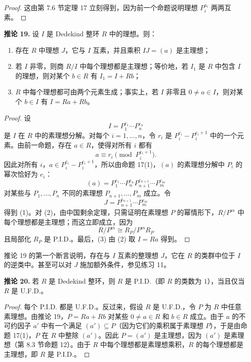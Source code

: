 \begin{proof}
这由第 7.6 节定理 17 立刻得到，因为前一个命题说明理想 $P_i^{a_i}$ 两两互素。
\end{proof}

\medskip
\noindent\textbf{推论 19.} 设 $I$ 是 Dedekind 整环 $R$ 中的理想。则：
\begin{enumerate}[label=(\arabic*)]
  \item 存在 $R$ 中理想 $J$，它与 $I$ 互素，并且乘积 $IJ=(a)$ 是主理想；
  \item 若 $I$ 非零，则商 $R/I$ 中每个理想都是主理想；等价地，若 $I_1$ 是 $R$ 中包含 $I$ 的理想，则对某个 $b\in R$ 有 $I_1=I+Rb$；
  \item $R$ 中每个理想都可由两个元素生成；事实上，若 $I$ 非零且 $0\neq a\in I$，则对某个 $b\in I$ 有 $I=Ra+Rb$。
\end{enumerate}

\begin{proof}
设
\[
  I=P_1^{e_1}\cdots P_n^{e_n}
\]
是 $I$ 在 $R$ 中的素理想分解。对每个 $i=1,
\ldots,n$，令 $r_i$ 是 $P_i^{e_i}-P_i^{e_i+1}$ 中的一个元素。由前一命题，存在 $a\in R$，使得对所有 $i$ 都有
\[
  a\equiv r_i\pmod{P_i^{e_i+1}}.
\]
因此对所有 $i$，$a\in P_i^{e_i}-P_i^{e_i+1}$，所以由命题 17(1)，$(a)$ 的素理想分解中 $P_i$ 的幂次恰好为 $e_i$：
\[
  (a)=P_1^{e_1}\cdots P_n^{e_n}P_{n+1}^{e_{n+1}}\cdots P_m^{e_m}
\]
对某些与 $P_1,
\ldots,P_n$ 不同的素理想 $P_{n+1},
\ldots,P_m$ 成立。令
\[
  J=P_{n+1}^{e_{n+1}}\cdots P_m^{e_m}
\]
得到 (1)。对 (2)，由中国剩余定理，只需证明在素理想 $P$ 的幂情形下，$R/P^m$ 中每个理想都是主理想；而这立即成立，因为
\[
  R/P^m\cong R_P/P^mR_P
\]
且局部化 $R_P$ 是 P.I.D.。最后，(3) 由 (2) 取 $I=Ra$ 得到。
\end{proof}

推论 19 的第一个断言说明，存在与 $I$ 互素的整理想 $J$，它在 $R$ 的类群中位于 $I$ 的逆类中。甚至可以对 $J$ 施加额外条件，参见练习 11。

\medskip
\noindent\textbf{推论 20.} 若 $R$ 是 Dedekind 整环，则 $R$ 是 P.I.D.（即 $R$ 的类数为 $1$），当且仅当 $R$ 是 U.F.D.。

\begin{proof}
每个 P.I.D. 都是 U.F.D.。反过来，假设 $R$ 是 U.F.D.，令 $P$ 为 $R$ 中任意素理想。由推论 19，$P=Ra+Rb$ 对某些 $0\neq a\in R$ 和 $b\in R$ 成立。由于 $a$ 的不可约因子 $a'$ 中有一个满足 $(a')\subseteq P$（因为它们的乘积属于素理想 $P$），于是由命题 17(1)，$P$ 在 $R$ 中整除 $(a')$。因此 $P=(a')$ 是主理想，因为 $(a')$ 是素理想（第 8.3 节命题 12）。由于 $R$ 中每个理想都是素理想乘积，$R$ 的每个理想都是主理想，即 $R$ 是 P.I.D.。
\end{proof}


